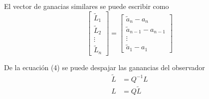 El vector de ganacias similares se puede escribir como
\[
    \begin{bmatrix}
        \tilde{L}_{1} \\ \tilde{L}_{2} \\ \vdots \\ \tilde{L}_{n}
    \end{bmatrix}
    =
    \begin{bmatrix}
        \tilde{a}_{n} - a_{n} \\
        \tilde{a}_{n-1} -a_{n-1} \\
        \vdots \\
        \tilde{a}_{1} -a_{1}
    \end{bmatrix}
\]

De la ecuación (4) se puede despajar las ganancias del observador
\[
    \begin{split}
        \tilde{L} & = Q^{-1}L \\
        L & = Q\tilde{L}
    \end{split}
\]